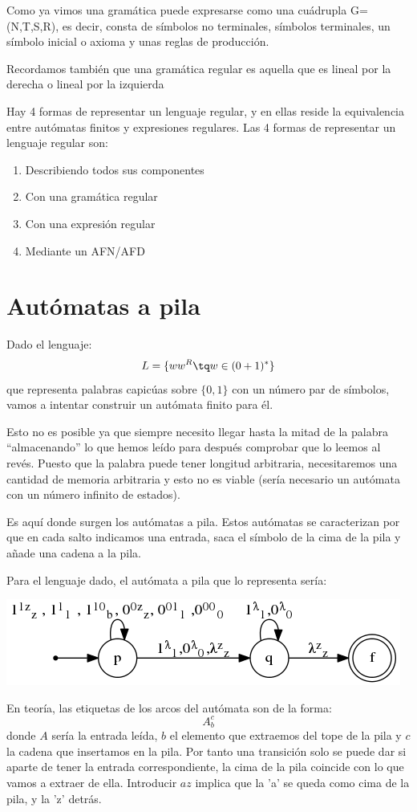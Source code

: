 \documentclass{apuntes}
\begin{document}
Como ya vimos una gramática puede expresarse como una cuádrupla G=(N,T,S,R), es decir, consta de símbolos no terminales, símbolos terminales, un símbolo inicial o axioma y unas reglas de producción.

Recordamos también que una gramática regular es aquella que es lineal por la derecha o lineal por la izquierda

Hay 4 formas de representar un lenguaje regular, y en ellas reside la equivalencia entre autómatas finitos y expresiones regulares. Las 4 formas de representar un lenguaje regular son:
\begin{enumerate}
\item Describiendo todos sus componentes
\item Con una gramática regular
\item Con una expresión regular
\item Mediante un AFN/AFD
\end{enumerate}

\newpage




\chapter{Autómatas a pila}
Dado el lenguaje:
\[L=\lbrace ww^R \tq w \in (0+1)^*\rbrace\]
que representa palabras capicúas sobre $\lbrace 0, 1\rbrace$ con un número par de símbolos, vamos a intentar construir un autómata finito para él.

Esto no es posible ya que siempre necesito llegar hasta la mitad de la palabra ``almacenando'' lo que hemos leído para después comprobar que lo leemos al revés. Puesto que la palabra puede tener longitud arbitraria, necesitaremos una cantidad de memoria arbitraria y esto no es viable (sería necesario un autómata con un número infinito de estados).

Es aquí donde surgen los autómatas a pila. Estos autómatas se caracterizan por que en cada salto indicamos una entrada, saca el símbolo de la cima de la pila y añade una cadena a la pila.

Para el lenguaje dado, el autómata a pila que lo representa sería:

\begin{center}
\includegraphics[scale=0.75]{automata5.png}
\end{center}
En teoría, las etiquetas de los arcos del autómata son de la forma:
\[A_b^c\]
donde $A$ sería la entrada leída, $b$ el elemento que extraemos del tope de la pila y $c$ la cadena que insertamos en la pila. Por tanto una transición solo se puede dar si aparte de tener la entrada correspondiente, la cima de la pila coincide con lo que vamos a extraer de ella. Introducir $az$ implica que la 'a' se queda como cima de la pila, y la 'z' detrás.
\end{document}
